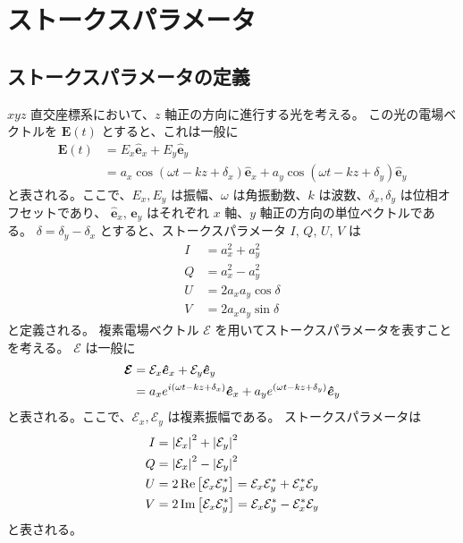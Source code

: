 \documentclass[../../main.tex]{subfiles}
\begin{document}
\chapter{ストークスパラメータ}
\label{chap:stokes}
\section{ストークスパラメータの定義}
\label{sec:stokes}
$xyz$ 直交座標系において、$z$ 軸正の方向に進行する光を考える。
この光の電場ベクトルを $\bm{E}(t)$ とすると、これは一般に
\begin{align}
    \bm{E}(t) &= E_{x} \bm{\hat{e}}_{x} + E_{y} \bm{\hat{e}}_{y} \\
        &= a_{x}\cos(\omega t - kz + \delta_x) \bm{\hat{e}}_{x} + a_{y}\cos(\omega t - kz + \delta_y) \bm{\hat{e}}_{y}
\end{align}
と表される。ここで、$E_{x}, E_{y}$ は振幅、$\omega$ は角振動数、$k$ は波数、$\delta_x, \delta_y$ は位相オフセットであり、
$\bm{\hat{e}}_x,\,\bm{\hat{e}}_y$ はそれぞれ $x$ 軸、$y$ 軸正の方向の単位ベクトルである。
$\delta = \delta_y - \delta_x$ とすると、ストークスパラメータ $I,\,Q,\,U,\,V$ は
\begin{align}
    I &= a_{x}^{2} + a_{y}^{2} \\
    Q &= a_{x}^{2} - a_{y}^{2} \\
    U &= 2a_{x}a_{y}\cos\delta \\
    V &= 2a_{x}a_{y}\sin\delta
\end{align}
と定義される。
複素電場ベクトル $\bm{\mathcal{E}}$ を用いてストークスパラメータを表すことを考える。
$\bm{\mathcal{E}}$ は一般に
\begin{align}
    \bm{\mathcal{E}} &= \mathcal{E}_{x}\bm{\hat{e}}_{x} + \mathcal{E}_{y}\bm{\hat{e}}_{y} \\
    &= a_{x}e^{i\qty(\omega t-kz+\delta_x)}\bm{\hat{e}}_{x} + a_{y}e^{\qty(\omega t-kz+\delta_y)}\bm{\hat{e}}_{y}
    \label{eq:complex_electric_field}
\end{align}
と表される。ここで、$\mathcal{E}_{x}, \mathcal{E}_{y}$ は複素振幅である。
ストークスパラメータは
\begin{align}
    I &= \abs{\mathcal{E}_{x}}^{2} + \abs{\mathcal{E}_{y}}^{2} \\
    Q &= \abs{\mathcal{E}_{x}}^{2} - \abs{\mathcal{E}_{y}}^{2} \\
    U &= 2\Re\qty[\mathcal{E}_{x}\mathcal{E}_{y}^{*}] = \mathcal{E}_x\mathcal{E}_{y}^{*}+\mathcal{E}_{x}^{*}\mathcal{E}_{y} \\
    V &= 2\Im\qty[\mathcal{E}_{x}\mathcal{E}_{y}^{*}] = \mathcal{E}_x\mathcal{E}_{y}^{*}-\mathcal{E}_{x}^{*}\mathcal{E}_{y}
\end{align}
と表される。
\end{document}
